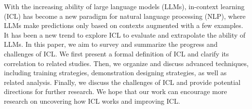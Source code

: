 With the increasing ability of large language models (LLMs), in-context learning (ICL) has become a new paradigm for natural language processing (NLP), where LLMs make predictions only based on contexts augmented with a few examples. It has been a new trend to explore ICL to evaluate and extrapolate the ability of LLMs.
In this paper, we aim to survey and summarize the progress and challenges of ICL. We first present a formal definition of ICL and clarify its correlation to related studies. Then, we organize and discuss advanced techniques, including training strategies, demonstration designing strategies, as well as related analysis.
Finally, we discuss the challenges of ICL and provide potential directions for further research. We hope that our work can encourage more research on uncovering how ICL works and improving ICL.


